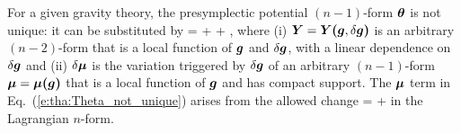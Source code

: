 \begin{prop}
\label{p:tha:ambiguities_theta}
For a given gravity theory, the presymplectic potential $(n-1)$-form $\bm{\theta}$
is not unique: it can be substituted by
\be \label{e:tha:Theta_not_unique}
   = \w{\theta} + \dd {} + \delta\w{\mu},
\ee
where (i) $\bm{Y}=\bm{Y}\textbf{(}\bm{g},\delta\bm{g}\textbf{)}$ is an
arbitrary $(n-2)$-form that is a local function of $\bm{g}$ and $\delta\bm{g}$,
with a linear dependence on $\delta\bm{g}$ and (ii)
$\delta\bm{\mu}$ is the variation triggered by $\delta\bm{g}$
of an arbitrary $(n-1)$-form $\bm{\mu} = \bm{\mu}\textbf{(}\bm{g}\textbf{)}$
that is a local function of $\bm{g}$ and has compact support.
The $\bm{\mu}$ term in Eq.~(\ref{e:tha:Theta_not_unique}) arises from the allowed
change
\be \label{e:tha:L_not_unique}
     =  + \dd\w{\mu}
\ee
in the Lagrangian $n$-form.
\end{prop}



